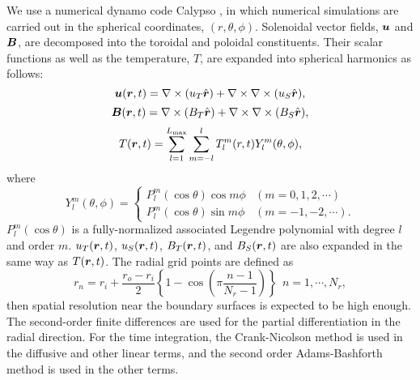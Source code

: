 {\color{red} %
We use a numerical dynamo code Calypso \cite{Matsui:2014}, in which numerical simulations are carried out in the spherical coordinates, $(r, \theta, \phi)$.
Solenoidal vector fields, $\mbox{\boldmath$u$}$ and $\mbox{\boldmath$B$}$, are decomposed into the toroidal and poloidal constituents.
Their scalar functions as well as the temperature, $T$, are expanded into spherical harmonics as follows:
%
\begin{equation}
\mbox{\boldmath$u$}(\mbox{\boldmath$r$}, t) = \nabla \times (u_T \hat{\mbox{\boldmath$r$}} ) + \nabla \times \nabla \times (u_S \hat{\mbox{\boldmath$r$}} ) ,
\label{eq:u_uT_uS}
\end{equation}
%
\begin{equation}
\mbox{\boldmath$B$}(\mbox{\boldmath$r$}, t) = \nabla \times (B_T \hat{\mbox{\boldmath$r$}} ) + \nabla \times \nabla \times (B_S \hat{\mbox{\boldmath$r$}} ) ,
\label{eq:B_BT_BS}
\end{equation}
%
\begin{equation}
T (\mbox{\boldmath$r$}, t) = \sum_{l = 1}^{L_{\rm max}} \sum_{m=-l}^{l} T_l^m(r, t) Y_l^m (\theta, \phi) ,
\label{eq:T_Ylm}
\end{equation}
%
where
\begin{equation}
Y_l^m (\theta, \phi) = \left\{
 \begin{array}{ll}
 P_l^m(\cos\theta)\cos m\phi & (m = 0, 1, 2, \cdots )
 \\
 P_l^m(\cos\theta)\sin m\phi & (m = -1, -2, \cdots ) .
 \end{array}
\right.
\label{eq:def_of_Ylm}
\end{equation}
%
$P_l^m(\cos\theta)$ is a fully-normalized associated Legendre polynomial with degree $l$ and order $m$.
$u_T(\mbox{\boldmath$r$}, t)$, $u_S(\mbox{\boldmath$r$}, t)$, $B_T(\mbox{\boldmath$r$}, t)$, and $B_S(\mbox{\boldmath$r$}, t)$ are also expanded in the same way as $T(\mbox{\boldmath$r$}, t)$.
The radial grid points are defined as
%
\begin{equation}
r_n = r_i + \frac{r_o - r_i}{2} \left\{ 1 - \cos \left( \pi \frac{n-1}{N_r-1} \right) \right\} ~~ n = 1, \cdots , N_r ,
\label{eq:def_of_rn}
\end{equation}
%
then spatial resolution near the boundary surfaces is expected to be high enough.
The second-order finite differences are used for the partial differentiation in the radial direction.
For the time integration, the Crank-Nicolson method is used in the diffusive and other linear terms, and the second order Adams-Bashforth method is used in the other terms.
}%

